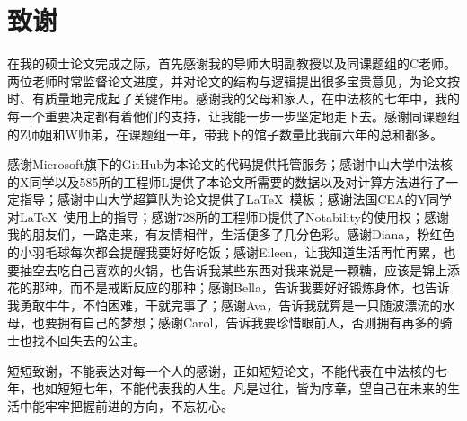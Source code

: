 
\chapter{致谢}

在我的硕士论文完成之际，首先感谢我的导师大明副教授以及同课题组的C老师。两位老师时常监督论文进度，并对论文的结构与逻辑提出很多宝贵意见，为论文按时、有质量地完成起了关键作用。感谢我的父母和家人，在中法核的七年中，我的每一个重要决定都有着他们的支持，让我能一步一步坚定地走下去。感谢同课题组的Z师姐和W师弟，在课题组一年，带我下的馆子数量比我前六年的总和都多。

感谢Microsoft旗下的GitHub为本论文的代码提供托管服务；感谢中山大学中法核的X同学以及585所的工程师L提供了本论文所需要的数据以及对计算方法进行了一定指导；感谢中山大学超算队为论文提供了\LaTeX\ 模板；感谢法国CEA的Y同学对\LaTeX\ 使用上的指导；感谢728所的工程师D提供了Notability的使用权；感谢我的朋友们，一路走来，有友情相伴，生活便多了几分色彩。感谢Diana，粉红色的小羽毛球每次都会提醒我要好好吃饭；感谢Eileen，让我知道生活再忙再累，也要抽空去吃自己喜欢的火锅，也告诉我某些东西对我来说是一颗糖，应该是锦上添花的那种，而不是戒断反应的那种；感谢Bella，告诉我要好好锻炼身体，也告诉我勇敢牛牛，不怕困难，干就完事了；感谢Ava，告诉我就算是一只随波漂流的水母，也要拥有自己的梦想；感谢Carol，告诉我要珍惜眼前人，否则拥有再多的骑士也找不回失去的公主。

短短致谢，不能表达对每一个人的感谢，正如短短论文，不能代表在中法核的七年，也如短短七年，不能代表我的人生。凡是过往，皆为序章，望自己在未来的生活中能牢牢把握前进的方向，不忘初心。

